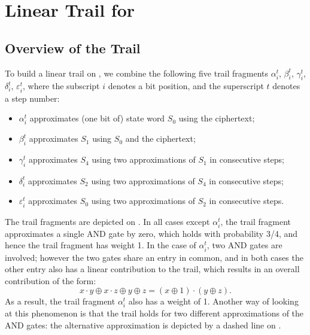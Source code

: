 \documentclass{llncs}
\begin{document}
\section{Linear Trail for }

\subsection{Overview of the Trail}

To build a linear trail on , we combine the following five trail fragments $\alpha^t_i$, $\beta^t_i$, $\gamma^t_i$, $\delta^t_i$, $\varepsilon^t_i$, where the subscript $i$ denotes a bit position, and the superscript $t$ denotes a step number:
\begin{itemize}
    \item $\alpha^t_i$ approximates (one bit of) state word $S_0$ using the ciphertext;
    \item $\beta^t_i$ approximates $S_1$ using $S_0$ and the ciphertext;
    \item $\gamma^t_i$ approximates $S_4$ using two approximations of $S_1$ in consecutive steps;
    \item $\delta^t_i$ approximates $S_2$ using two approximations of $S_4$ in consecutive steps;
    \item $\varepsilon^t_i$ approximates $S_0$ using two approximations of $S_2$ in consecutive steps.
\end{itemize}

The trail fragments are depicted on . In all cases except $\alpha^t_i$, the trail fragment approximates a single AND gate by zero, which holds with probability 3/4, and hence the trail fragment has weight 1. In the case of $\alpha^t_i$, two AND gates are involved; however the two gates share an entry in common, and in both cases the other entry also has a linear contribution to the trail, which results in an overall contribution of the form:
\[
x \cdot y \oplus x \cdot z \oplus y \oplus z= (x \oplus 1) \cdot (y \oplus z).
\]
As a result, the trail fragment $\alpha^t_i$ also has a weight of 1. Another way of looking at this phenomenon is that the trail holds for two different approximations of the AND gates: the alternative approximation is depicted by a dashed line on .
\end{document}
